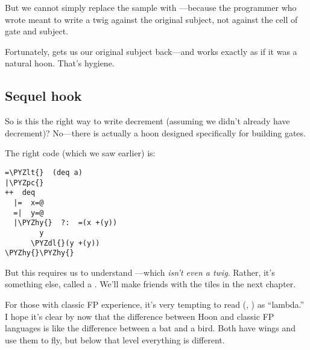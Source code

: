 But we cannot simply replace the sample with ---because the
programmer who wrote  meant to write a twig against the
original subject, not against the cell of gate and subject.

Fortunately,  gets us our original subject back---and
\kode{\%-} works exactly as if it was a natural hoon.  That's hygiene.

\subsection{Sequel hook}

So is this the right way to write decrement (assuming we didn't
already have decrement)?  No---there is actually a hoon designed
specifically for building gates.  

The right code (which we saw earlier) is:
\begin{framed_shaded}
\begin{Verbatim}[fontsize=\relsize{-2.5},fontseries=b,commandchars=\\\{\}]
=\PYZlt{}  (deq a)
|\PYZpc{}
++  deq
  |=  x=@
  =|  y=@
  |\PYZhy{}  ?:  =(x +(y))
        y
      \PYZdl{}(y +(y))
\PYZhy{}\PYZhy{}
\end{Verbatim}
\end{framed_shaded}

But this requires us to understand ---which \emph{isn't even a
twig}.  Rather, it's something else, called a .  We'll make
friends with the tiles in the next chapter.

For those with classic FP experience, it's very tempting to read
\kode{\textbar{}=} (, ) as ``lambda.''  I hope it's clear by now
that the difference between Hoon and classic FP languages is like
the difference between a bat and a bird.  Both have wings and use
them to fly, but below that level everything is different.